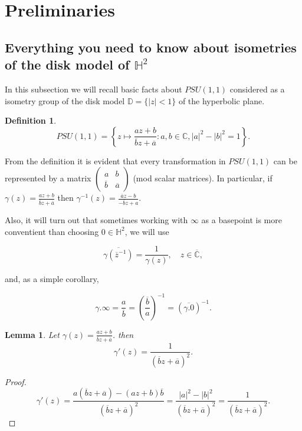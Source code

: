 \documentclass[11pt]{article}
\newtheorem{definition}{Definition}[section]
\newtheorem{lemma}{Lemma}[section]
\begin{document}
\section{Preliminaries}
\label{Preliminaries}
\subsection{Everything you need to know about isometries of the disk model of $\mathbb{H}^2$}
In this subsection we will recall basic facts about $PSU(1,1)$ considered as a isometry group of the disk model $\mathbb{D} = \{ |z| < 1 \}$ of the hyperbolic plane. 
\begin{definition}
	\[
	PSU(1,1) = \left\lbrace z \mapsto \frac{az + b}{\overline{b} z + \overline{a}} : a, b \in \mathbb{C}, |a|^2 - |b|^2 = 1 \right\rbrace.
	\]
\end{definition}

From the definition it is evident that every transformation in $PSU(1,1)$ can be represented by a matrix $\begin{pmatrix}
	a & b \\ \overline{b} & \overline{a}
\end{pmatrix}$ (mod scalar matrices). In particular, if $\gamma(z) = \frac{az + b}{\overline{b} z + \overline{a}}$ then $\gamma^{-1}(z) = \frac{\overline{a} z - b}{ -\overline{b}z + a}$.

Also, it will turn out that sometimes working with $\infty$ as a basepoint is more conventient than choosing $0 \in \mathbb{H}^2$, we will use

\begin{equation}
	\label{from inside to outside}
	\overline{\gamma\left( \overline{z}^{-1} \right)} = \frac{1}{\gamma(z)}, \quad z \in \overline{\mathbb{C}},
\end{equation}

and, as a simple corollary,

\begin{equation}
	\label{zero-infty}
	\gamma.\infty = \frac{a}{\overline{b}} = \left( \frac{\overline{b}}{a}\right)^{-1} = (\overline{\gamma.0})^{-1}.
\end{equation}

\begin{lemma}
	Let $\gamma(z) = \frac{az + b}{\overline{b} z + \overline{a}}$. then
	\[
	\gamma'(z) = \frac{1}{(\overline{b} z + \overline{a})^2}.
	\]
\end{lemma}

\begin{proof}
	\[
	\gamma'(z) = \frac{a ( \overline{b} z + \overline{a} ) - (az + b)\overline{b}}{(\overline{b} z + \overline{a})^2} = \frac{|a|^2 - |b|^2}{(\overline{b} z + \overline{a})^2} = \frac{1}{(\overline{b} z + \overline{a})^2}.
	\]
\end{proof}
\end{document}
